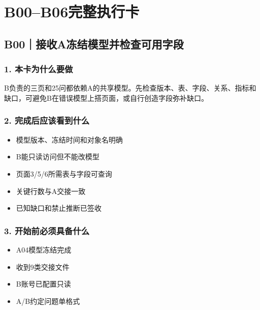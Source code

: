 \documentclass[UTF8,openany,zihao=-4]{ctexbook}
\renewcommand{\_}{\textunderscore\allowbreak}
\begin{document}
\chapter{B00--B06完整执行卡}
\section{B00｜接收A冻结模型并检查可用字段}
\subsection*{1. 本卡为什么要做}
B负责的三页和25问都依赖A的共享模型。先检查版本、表、字段、关系、指标和缺口，可避免B在错误模型上搭页面，或自行创造字段弥补缺口。


\subsection*{2. 完成后应该看到什么}
\begin{itemize}
\item 模型版本、冻结时间和对象名明确
\item B能只读访问但不能改模型
\item 页面3/5/6所需表与字段可查询
\item 关键行数与A交接一致
\item 已知缺口和禁止推断已签收
\end{itemize}

\subsection*{3. 开始前必须具备什么}
\begin{itemize}[label=$\square$]
\item A04模型冻结完成
\item 收到9类交接文件
\item B账号已配置只读
\item A/B约定问题单格式
\end{itemize}
\end{document}
